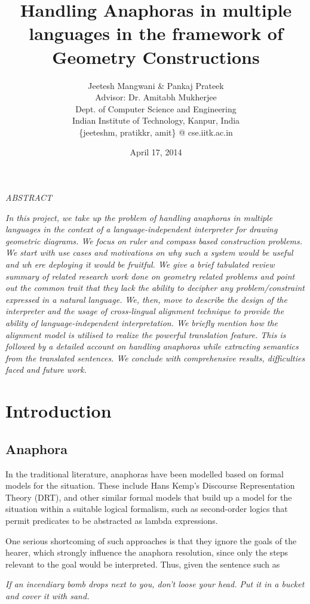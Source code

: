 \def\DevnagVersion{2.15}\documentclass[12pt]{article}
\title{Handling Anaphoras in multiple languages in the framework of Geometry Constructions}
\author{Jeetesh Mangwani \& Pankaj Prateek\\
	Advisor: Dr. Amitabh Mukherjee\\
        Dept. of Computer Science and Engineering\\
	Indian Institute of Technology, Kanpur, India\\
	\{jeeteshm, pratikkr, amit\} @ cse.iitk.ac.in}
\date{April 17, 2014}
\begin{document}
\maketitle
\begin{center}{\b \em ABSTRACT}\end{center}
{\em In this project, we take up the problem of handling anaphoras in multiple languages in the context of a language-independent interpreter for drawing geometric diagrams. We focus on ruler and compass based construction problems. We start with use cases and motivations on why such a system would be useful and wh ere deploying it would be fruitful. We give a brief tabulated review summary of related research work done on geometry related problems and point out the common trait that they lack the ability to decipher any problem/constraint expressed in a natural language. We, then, move to describe the design of the interpreter and the usage of cross-lingual alignment technique to provide the ability of language-independent interpretation. We briefly mention how the alignment model is utilised to realize the powerful translation feature. This is followed by a detailed account on handling anaphoras while extracting semantics from the translated sentences. We conclude with comprehensive results, difficulties faced and future work.}

\section{Introduction}

\subsection{Anaphora}
In the traditional literature, anaphoras have been modelled based on formal models for the situation. These include Hans Kemp's Discourse Representation Theory (DRT), and other similar formal models that build up a model for the situation within a suitable logical formalism, such as second-order logics that permit predicates to be abstracted as lambda expressions.

One serious shortcoming of such approaches is that they ignore the goals of the hearer, which strongly influence the anaphora resolution, since only the steps relevant to the goal would be interpreted. Thus, given the sentence such as

\begin{center}
{\em If an incendiary bomb drops next to you, don't loose your head. Put it in a bucket and cover it with
sand.} ~\cite{root-RL-86-phd-ut_semantics-of-anaphora-in-discourse}
\end{center}
\end{document}
